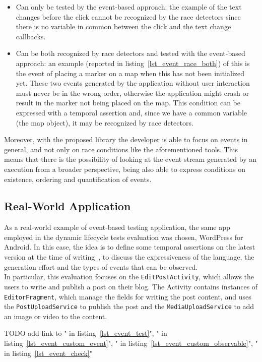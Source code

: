 \documentclass[11pt,a4paper,notitlepage]{article}
\begin{document}
{\begin{itemize}
	\item Can only be tested by the event-based approach: the example of the text changes before the click cannot be recognized by the race detectors since there is no variable in common between the click and the text change callbacks.
	\item Can be both recognized by race detectors and tested with the event-based approach: an example (reported in listing~\ref{lst_event_race_both}) of this is the event of placing a marker on a map when this has not been initialized yet. These two events generated by the application without user interaction must never be in the wrong order, otherwise the application might crash or result in the marker not being placed on the map. This condition can be expressed with a temporal assertion and, since we have a common variable (the map object), it may be recognized by race detectors.
\end{itemize}\medskip
Moreover, with the proposed library the developer is able to focus on events in general, and not only on race conditions like the aforementioned tools. This means that there is the possibility of looking at the event stream generated by an execution from a broader perspective, being also able to express conditions on existence, ordering and quantification of events.

\subsection{Real-World Application}
As a real-world example of event-based testing application, the same app employed in the dynamic lifecycle tests evaluation was chosen, WordPress for Android. In this case, the idea is to define some temporal assertions on the latest version at the time of writing~\cite{WordPress2016-07-15}, to discuss the expressiveness of the language, the generation effort and the types of events that can be observed.\medskip \\
In particular, this evaluation focuses on the \texttt{EditPostActivity}, which allows the users to write and publish a post on their blog. The Activity contains instances of \texttt{EditorFragment}, which manage the fields for writing the post content, and uses the \texttt{PostUploadService} to publish the post and the \texttt{MediaUploadService} to add an image or video to the content.

TODO add link to " in listing~\ref{lst_event_test}", " in listing~\ref{lst_event_custom_event}", " in listing~\ref{lst_event_custom_observable}", " in listing~\ref{lst_event_check}"

}
\end{document}

